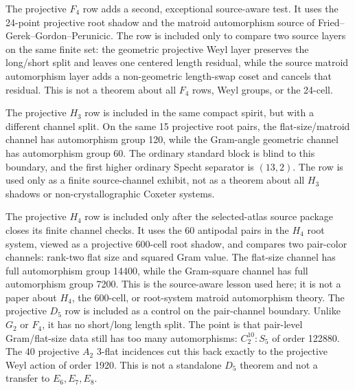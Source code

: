 The projective \(F_4\) row adds a second, exceptional source-aware test.  It uses the 24-point projective root shadow and the matroid automorphism source of Fried--Gerek--Gordon--Perunicic\cite{FriedGerekGordonPerunicic2007F4Matroid}.  The row is included only to compare two source layers on the same finite set: the geometric projective Weyl layer preserves the long/short split and leaves one centered length residual, while the source matroid automorphism layer adds a non-geometric length-swap coset and cancels that residual.  This is not a theorem about all \(F_4\) rows, Weyl groups, or the 24-cell.

The projective \(H_3\) row is included in the same compact spirit, but with a different channel split.  On the same 15 projective root pairs, the flat-size/matroid channel has automorphism group 120, while the Gram-angle geometric channel has automorphism group 60.  The ordinary standard block is blind to this boundary, and the first higher ordinary Specht separator is \((13,2)\).  The row is used only as a finite source-channel exhibit, not as a theorem about all \(H_3\) shadows or non-crystallographic Coxeter systems.

The projective \(H_4\) row is included only after the selected-atlas source package closes its finite channel checks.  It uses the 60 antipodal pairs in the \(H_4\) root system, viewed as a projective 600-cell root shadow, and compares two pair-color channels: rank-two flat size and squared Gram value.  The flat-size channel has full automorphism group 14400, while the Gram-square channel has full automorphism group 7200.  This is the source-aware lesson used here; it is not a paper about \(H_4\), the 600-cell, or root-system matroid automorphism theory.
The projective \(D_5\) row is included as a control on the pair-channel boundary.  Unlike \(G_2\) or \(F_4\), it has no short/long length split.  The point is that pair-level Gram/flat-size data still has too many automorphisms: \(C_2^{10}:S_5\) of order 122880.  The 40 projective \(A_2\) 3-flat incidences cut this back exactly to the projective Weyl action of order 1920.  This is not a standalone \(D_5\) theorem and not a transfer to \(E_6,E_7,E_8\).

